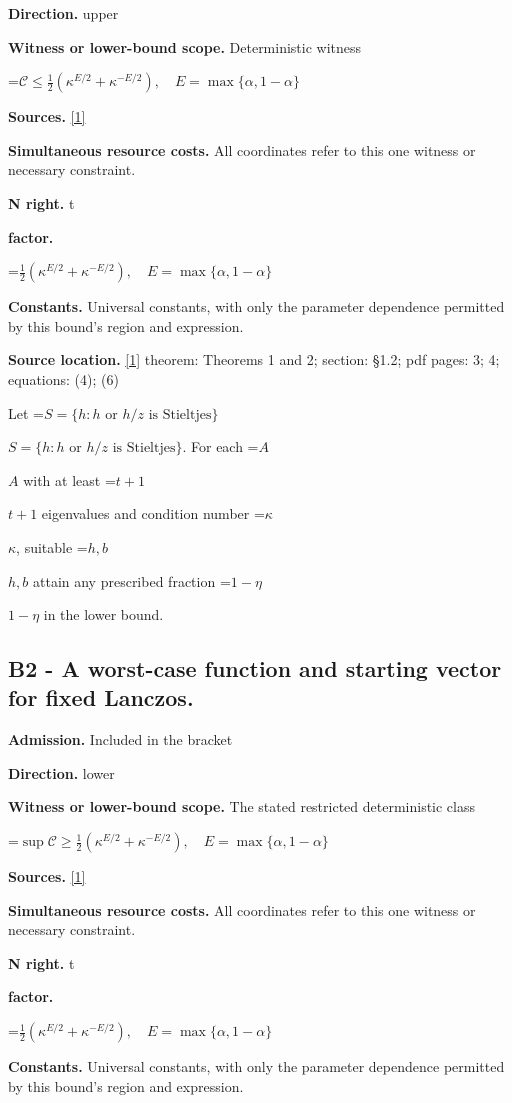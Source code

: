 \documentclass[10pt,a4paper]{article}
\newcommand{\AtlasMath}[1]{\par\begingroup\centering\setbox0=\hbox{$\displaystyle #1$}\ifdim\wd0>1.4\linewidth\typeout{ATLAS WIDE FORMULA: \the\wd0}\fi\ifdim\wd0>\linewidth\resizebox{\linewidth}{!}{\box0}\else\box0\fi\par\endgroup}
\newcommand{\AtlasInlineMath}[1]{\begingroup\setbox0=\hbox{$#1$}\ifdim\wd0>.4\linewidth\endgroup\AtlasMath{#1}\else\endgroup$#1$\fi}
\begin{document}
\textbf{Direction.} upper

\textbf{Witness or lower-bound scope.} Deterministic witness

\AtlasMath{\mathcal{C}\le \frac{1}{2}(\kappa^{E/2}+\kappa^{-E/2}),\quad E=\max\{\alpha,1-\alpha\}}
\textbf{Sources.} \href{https://arxiv.org/pdf/2608.07160v1}{[1]}

\textbf{Simultaneous resource costs.} All coordinates refer to this one witness or necessary constraint.

\textbf{N right.} t

\textbf{factor.}

\AtlasMath{\frac12(\kappa^{E/2}+\kappa^{-E/2}),\quad E=\max\{\alpha,1-\alpha\}}
\textbf{Constants.} Universal constants, with only the parameter dependence permitted by this bound’s region and expression.

\textbf{Source location.} \href{https://arxiv.org/pdf/2608.07160v1}{[1]} theorem: Theorems 1 and 2; section: §1.2; pdf pages: 3; 4; equations: (4); (6)

Let \AtlasInlineMath{S=\{h:h\text{ or }h/z\text{ is Stieltjes}\}}. For each \AtlasInlineMath{A} with at least \AtlasInlineMath{t+1} eigenvalues and condition number \AtlasInlineMath{\kappa}, suitable \AtlasInlineMath{h,b} attain any prescribed fraction \AtlasInlineMath{1-\eta} in the lower bound.

\subsection{B2 - A worst-case function and starting vector for fixed Lanczos.}
\textbf{Admission.} Included in the bracket

\textbf{Direction.} lower

\textbf{Witness or lower-bound scope.} The stated restricted deterministic class

\AtlasMath{\sup\mathcal{C}\ge \frac{1}{2}(\kappa^{E/2}+\kappa^{-E/2}),\quad E=\max\{\alpha,1-\alpha\}}
\textbf{Sources.} \href{https://arxiv.org/pdf/2608.07160v1}{[1]}

\textbf{Simultaneous resource costs.} All coordinates refer to this one witness or necessary constraint.

\textbf{N right.} t

\textbf{factor.}

\AtlasMath{\frac12(\kappa^{E/2}+\kappa^{-E/2}),\quad E=\max\{\alpha,1-\alpha\}}
\textbf{Constants.} Universal constants, with only the parameter dependence permitted by this bound’s region and expression.
\end{document}
